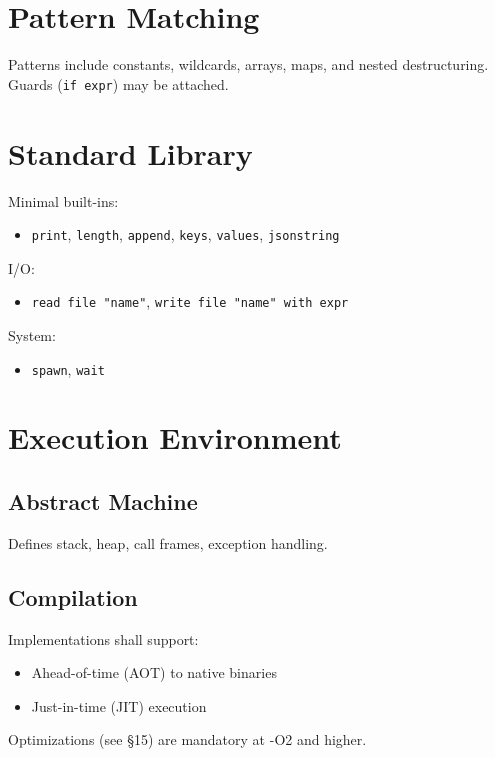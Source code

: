 \documentclass[12pt,a4paper]{article}
\begin{document}
\section{Pattern Matching}
Patterns include constants, wildcards, arrays, maps, and nested destructuring. Guards (\texttt{if expr}) may be attached.

\section{Standard Library}
Minimal built-ins:
\begin{itemize}
\item \texttt{print}, \texttt{length}, \texttt{append}, \texttt{keys}, \texttt{values}, \texttt{jsonstring}
\end{itemize}

I/O:
\begin{itemize}
\item \texttt{read file "name"}, \texttt{write file "name" with expr}
\end{itemize}

System:
\begin{itemize}
\item \texttt{spawn}, \texttt{wait}
\end{itemize}

\section{Execution Environment}

\subsection{Abstract Machine}
Defines stack, heap, call frames, exception handling.

\subsection{Compilation}
Implementations shall support:
\begin{itemize}
\item Ahead-of-time (AOT) to native binaries
\item Just-in-time (JIT) execution
\end{itemize}

Optimizations (see §15) are mandatory at -O2 and higher.
\end{document}
